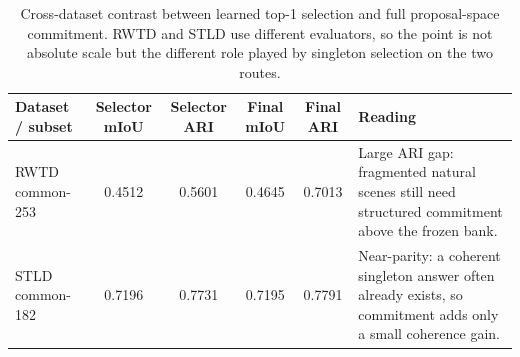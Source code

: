 \begin{table}[t]
\centering
\scriptsize
\begin{tabularx}{\textwidth}{@{}XccccX@{}}
\toprule
Dataset / subset & Selector mIoU & Selector ARI & Final mIoU & Final ARI & Reading \\
\midrule
RWTD common-253 & 0.4512 & 0.5601 & 0.4645 & 0.7013 & Large ARI gap: fragmented natural scenes still need structured commitment above the frozen bank. \\
STLD common-182 & 0.7196 & 0.7731 & 0.7195 & 0.7791 & Near-parity: a coherent singleton answer often already exists, so commitment adds only a small coherence gain. \\
\bottomrule
\end{tabularx}
\caption{Cross-dataset contrast between learned top-1 selection and full proposal-space commitment. RWTD and STLD use different evaluators, so the point is not absolute scale but the different role played by singleton selection on the two routes.}
\label{tab:stld_selector_contrast}
\end{table}
